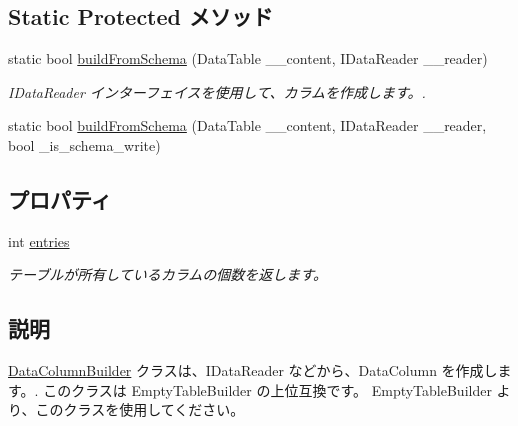\subsection*{Static Protected メソッド}
\begin{DoxyCompactItemize}
\item 
static bool \hyperlink{classlazurite_1_1pattern_1_1building_1_1_data_column_builder_afe2795803790c7f24554b6809aee2c51}{buildFromSchema} (DataTable \_\-\_\-content, IDataReader \_\-\_\-reader)
\begin{DoxyCompactList}\small\item\em IDataReader インターフェイスを使用して、カラムを作成します。. \item\end{DoxyCompactList}\item 
static bool \hyperlink{classlazurite_1_1pattern_1_1building_1_1_data_column_builder_a25241beb4bdca602a6401e0e326acf7b}{buildFromSchema} (DataTable \_\-\_\-content, IDataReader \_\-\_\-reader, bool \_\-is\_\-schema\_\-write)
\end{DoxyCompactItemize}
\subsection*{プロパティ}
\begin{DoxyCompactItemize}
\item 
int \hyperlink{classlazurite_1_1pattern_1_1building_1_1_data_column_builder_a6195bbc21ca91e6f5160e89d525a8179}{entries}
\begin{DoxyCompactList}\small\item\em テーブルが所有しているカラムの個数を返します。 \item\end{DoxyCompactList}\end{DoxyCompactItemize}


\subsection{説明}
\hyperlink{classlazurite_1_1pattern_1_1building_1_1_data_column_builder}{DataColumnBuilder} クラスは、IDataReader などから、DataColumn を作成します。. このクラスは EmptyTableBuilder の上位互換です。 EmptyTableBuilder より、このクラスを使用してください。 

